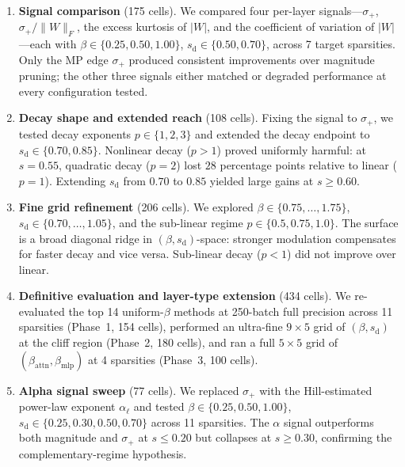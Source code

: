 \documentclass[11pt]{article}
\theoremstyle{plain}
\theoremstyle{definition}
\theoremstyle{remark}
\newcommand{\1}{\mathbf{1}}
\begin{document}
\begin{enumerate}[leftmargin=2em]
\item \textbf{Signal comparison} (175 cells).  We compared four per-layer signals---\(\sigma_+\), \(\sigma_+/\|W\|_F\), the excess kurtosis of \(|W|\), and the coefficient of variation of \(|W|\)---each with \(\beta\in\{0.25,0.50,1.00\}\), \(s_{\mathrm{d}}\in\{0.50,0.70\}\), across 7 target sparsities.  Only the MP edge \(\sigma_+\) produced consistent improvements over magnitude pruning; the other three signals either matched or degraded performance at every configuration tested.

\item \textbf{Decay shape and extended reach} (108 cells).  Fixing the signal to \(\sigma_+\), we tested decay exponents \(p\in\{1,2,3\}\) and extended the decay endpoint to \(s_{\mathrm{d}}\in\{0.70,0.85\}\).  Nonlinear decay (\(p>1\)) proved uniformly harmful: at \(s=0.55\), quadratic decay (\(p=2\)) lost \(28\) percentage points relative to linear (\(p=1\)).  Extending \(s_{\mathrm{d}}\) from \(0.70\) to \(0.85\) yielded large gains at \(s\ge 0.60\).

\item \textbf{Fine grid refinement} (206 cells).  We explored \(\beta\in\{0.75,\dots,1.75\}\), \(s_{\mathrm{d}}\in\{0.70,\dots,1.05\}\), and the sub-linear regime \(p\in\{0.5,0.75,1.0\}\).  The surface is a broad diagonal ridge in \((\beta, s_{\mathrm{d}})\)-space: stronger modulation compensates for faster decay and vice versa.  Sub-linear decay (\(p<1\)) did not improve over linear.

\item \textbf{Definitive evaluation and layer-type extension} (434 cells).  We re-evaluated the top 14 uniform-\(\beta\) methods at 250-batch full precision across 11 sparsities (Phase~1, 154 cells), performed an ultra-fine \(9\times 5\) grid of \((\beta, s_{\mathrm{d}})\) at the cliff region (Phase~2, 180 cells), and ran a full \(5\times 5\) grid of \((\beta_{\mathrm{attn}}, \beta_{\mathrm{mlp}})\) at 4 sparsities (Phase~3, 100 cells).

\item \textbf{Alpha signal sweep} (77 cells).  We replaced \(\sigma_+\) with the Hill-estimated power-law exponent \(\alpha_\ell\) and tested \(\beta\in\{0.25,0.50,1.00\}\), \(s_{\mathrm{d}}\in\{0.25,0.30,0.50,0.70\}\) across 11 sparsities.  The \(\alpha\) signal outperforms both magnitude and \(\sigma_+\) at \(s\le 0.20\) but collapses at \(s\ge 0.30\), confirming the complementary-regime hypothesis.
\end{enumerate}
\end{document}
